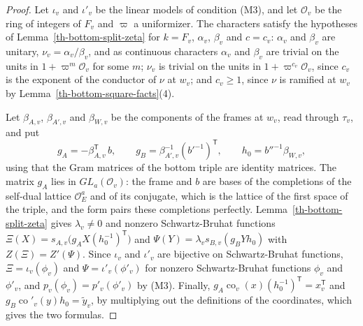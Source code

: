 \begin{proof}
Let $\iota_v$ and $\iota'_v$ be the linear models of condition (M3), and let
$\mathcal O_v$ be the ring of integers of $F_v$ and $\varpi$ a uniformizer. The
characters satisfy the hypotheses of Lemma~\ref{th-bottom-split-zeta} for
$k=F_v$, $\alpha_v$, $\beta_v$ and $c=c_v$: $\alpha_v$ and $\beta_v$ are
unitary, $\nu_v=\alpha_v/\beta_v$, and as continuous characters $\alpha_v$ and
$\beta_v$ are trivial on the units in $1+\varpi^m\mathcal O_v$ for some $m$;
$\nu_v$ is trivial on the units in $1+\varpi^{c_v}\mathcal O_v$, since $c_v$ is
the exponent of the conductor of $\nu$ at $w_v$; and $c_v\geq1$, since $\nu$ is
ramified at $w_v$ by Lemma~\ref{th-bottom-square-facts}(4).

Let $\beta_{A,v}$, $\beta_{A',v}$ and $\beta_{W,v}$ be the components of the
frames at $w_v$, read through $\tau_v$, and put
\[
g_A=-\beta_{A,v}^{\mathsf T}\,b,\qquad
g_B=\beta_{A',v}^{-1}(b'^{-1})^{\mathsf T},\qquad
h_0=b''^{-1}\beta_{W,v},
\]
using that the Gram matrices of the bottom triple are identity matrices. The
matrix $g_A$ lies in $GL_a(\mathcal O_v)$: the frame and $b$ are bases of the
completions of the self-dual lattice $\mathcal O_E^a$ and of its conjugate,
which is the lattice of the first space of the triple, and the form pairs these
completions perfectly. Lemma~\ref{th-bottom-split-zeta} gives $\lambda_v\neq0$
and nonzero Schwartz-Bruhat functions
$\Xi(X)=s_{A,v}\bigl(g_AX(h_0^{-1})^{\mathsf T}\bigr)$ and
$\Psi(Y)=\lambda_vs_{B,v}(g_BYh_0)$ with $Z(\Xi)=Z'(\Psi)$. Since $\iota_v$ and
$\iota'_v$ are bijective on Schwartz-Bruhat functions, $\Xi=\iota_v(\phi_v)$ and
$\Psi=\iota'_v(\phi'_v)$ for nonzero Schwartz-Bruhat functions $\phi_v$ and
$\phi'_v$, and $p_v(\phi_v)=p'_v(\phi'_v)$ by (M3). Finally,
$g_A\operatorname{co}_v(x)(h_0^{-1})^{\mathsf T}=x_v^{\mathsf T}$ and
$g_B\operatorname{co}'_v(y)h_0=\tilde y_v$, by multiplying out the definitions of
the coordinates, which gives the two formulas.
\end{proof}

